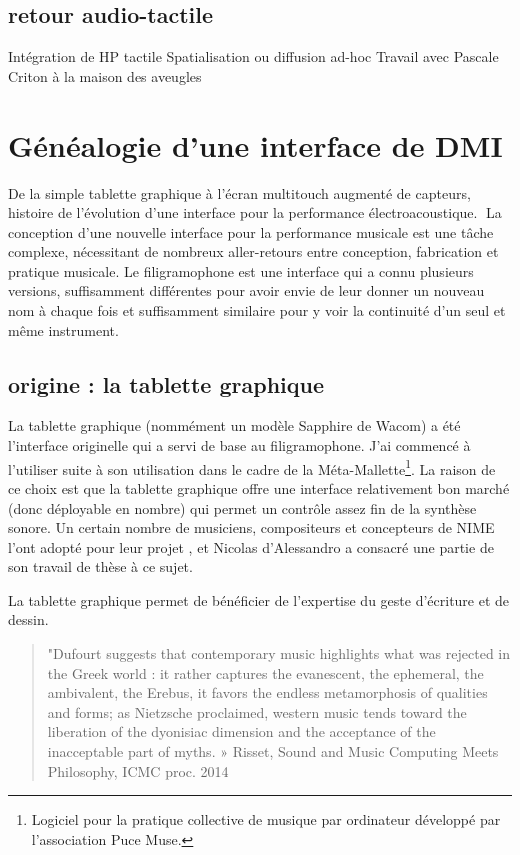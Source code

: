 \subsection{retour audio-tactile}
Intégration de HP tactile
Spatialisation ou diffusion ad-hoc
Travail avec Pascale Criton à la maison des aveugles


\section{Généalogie d’une interface de DMI}
\label{sec:interfaces:sec1}

De la simple tablette graphique à l’écran multitouch augmenté de capteurs, histoire de l’évolution d’une interface pour la performance électroacoustique.
La conception d’une nouvelle interface pour la performance musicale est une tâche complexe, nécessitant de nombreux aller-retours entre conception, fabrication et pratique musicale. Le filigramophone est une interface qui a connu plusieurs versions, suffisamment différentes pour avoir envie de leur donner un nouveau nom à chaque fois et suffisamment similaire pour y voir la continuité d’un seul et même instrument.

\subsection{origine : la tablette graphique}
La tablette graphique (nommément un modèle Sapphire de Wacom) a été l’interface originelle qui a servi de base au filigramophone. J’ai commencé à l’utiliser suite à son utilisation dans le cadre de la Méta-Mallette\footnote{Logiciel pour la pratique collective de musique par ordinateur développé par l’association Puce Muse.}. La raison de ce choix est que la tablette graphique offre une interface relativement bon marché (donc déployable en nombre) qui permet un contrôle assez fin de la synthèse sonore.
Un certain nombre de musiciens, compositeurs et concepteurs de NIME l’ont adopté pour leur projet \cite{Zby07}, et Nicolas d’Alessandro a consacré une partie de son travail de thèse \cite{Ale09} à ce sujet.

La tablette graphique permet de bénéficier de l’expertise du geste d’écriture et de dessin.

\begin{quote}
"Dufourt suggests that contemporary music highlights what was rejected in the Greek world : it rather captures the evanescent, the ephemeral, the ambivalent, the Erebus, it favors the endless metamorphosis of qualities and forms; as Nietzsche proclaimed, western music tends toward the liberation of the dyonisiac dimension and the acceptance of the inacceptable part of myths. » Risset, Sound and Music Computing Meets Philosophy, ICMC proc. 2014
\end{quote}

